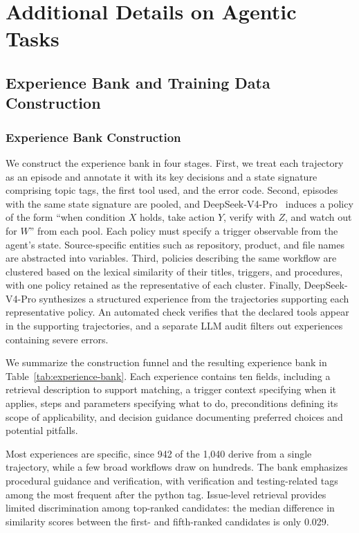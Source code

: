 \section{Additional Details on Agentic Tasks}
\label{appendix:detail_application}


\subsection{Experience Bank and Training Data Construction}

\subsubsection{Experience Bank Construction}

We construct the experience bank in four stages. First, we treat each trajectory as an episode and annotate it with its key decisions and a state signature comprising topic tags, the first tool used, and the error code. Second, episodes with the same state signature are pooled, and DeepSeek-V4-Pro~\cite{deepseekai2026deepseekv4} induces a policy of the form ``when condition \(X\) holds, take action \(Y\), verify with \(Z\), and watch out for \(W\)'' from each pool. Each policy must specify a trigger observable from the agent's state. Source-specific entities such as repository, product, and file names are abstracted into variables. Third, policies describing the same workflow are clustered based on the lexical similarity of their titles, triggers, and procedures, with one policy retained as the representative of each cluster. Finally, DeepSeek-V4-Pro synthesizes a structured experience from the trajectories supporting each representative policy. An automated check verifies that the declared tools appear in the supporting trajectories, and a separate LLM audit
filters out experiences containing severe errors.

We summarize the construction funnel and the
resulting experience bank in Table~\ref{tab:experience-bank}. Each experience contains ten fields, including a retrieval description to support matching, a trigger context specifying when it applies, steps and parameters specifying what to do, preconditions defining its scope of applicability, and decision guidance documenting preferred choices and potential pitfalls.

Most experiences are specific, since 942 of the 1{,}040 derive from a single trajectory, while a few broad workflows draw on hundreds. The bank emphasizes procedural guidance and verification, with verification and testing-related tags among the most frequent after the python tag. Issue-level retrieval provides limited discrimination among top-ranked candidates: the median difference in similarity scores between the first- and fifth-ranked candidates is only 0.029.

